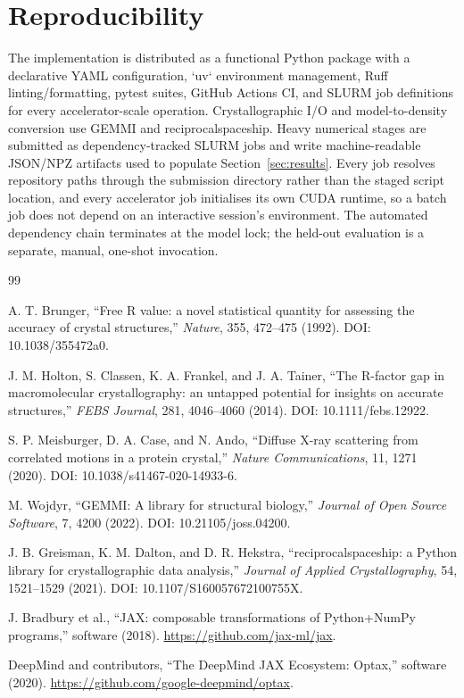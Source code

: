 \documentclass[11pt]{article}
\begin{document}
\section{Reproducibility}
The implementation is distributed as a functional Python package with a declarative YAML configuration, `uv` environment management, Ruff linting/formatting, pytest suites, GitHub Actions CI, and SLURM job definitions for every accelerator-scale operation. Crystallographic I/O and model-to-density conversion use GEMMI and reciprocalspaceship. Heavy numerical stages are submitted as dependency-tracked SLURM jobs and write machine-readable JSON/NPZ artifacts used to populate Section~\ref{sec:results}. Every job resolves repository paths through the submission directory rather than the staged script location, and every accelerator job initialises its own CUDA runtime, so a batch job does not depend on an interactive session's environment. The automated dependency chain terminates at the model lock; the held-out evaluation is a separate, manual, one-shot invocation.

\begin{thebibliography}{99}

A. T. Brunger, ``Free R value: a novel statistical quantity for assessing the accuracy of crystal structures,'' \textit{Nature}, 355, 472--475 (1992). DOI: 10.1038/355472a0.

J. M. Holton, S. Classen, K. A. Frankel, and J. A. Tainer, ``The R-factor gap in macromolecular crystallography: an untapped potential for insights on accurate structures,'' \textit{FEBS Journal}, 281, 4046--4060 (2014). DOI: 10.1111/febs.12922.

S. P. Meisburger, D. A. Case, and N. Ando, ``Diffuse X-ray scattering from correlated motions in a protein crystal,'' \textit{Nature Communications}, 11, 1271 (2020). DOI: 10.1038/s41467-020-14933-6.

M. Wojdyr, ``GEMMI: A library for structural biology,'' \textit{Journal of Open Source Software}, 7, 4200 (2022). DOI: 10.21105/joss.04200.

J. B. Greisman, K. M. Dalton, and D. R. Hekstra, ``reciprocalspaceship: a Python library for crystallographic data analysis,'' \textit{Journal of Applied Crystallography}, 54, 1521--1529 (2021). DOI: 10.1107/S160057672100755X.

J. Bradbury et al., ``JAX: composable transformations of Python+NumPy programs,'' software (2018). \url{https://github.com/jax-ml/jax}.

DeepMind and contributors, ``The DeepMind JAX Ecosystem: Optax,'' software (2020). \url{https://github.com/google-deepmind/optax}.

\end{thebibliography}
\end{document}
